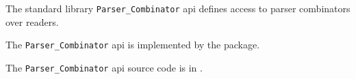 
The standard library {\tt Parser\_Combinator} api defines access to parser 
combinators over readers.

The {\tt Parser\_Combinator} api is implemented by the  package.

The {\tt Parser\_Combinator} api source code is in .


